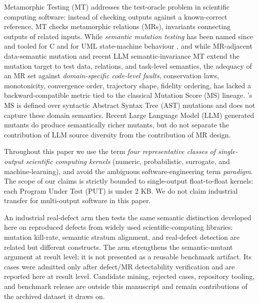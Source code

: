 \documentclass[manuscript,screen,review]{acmart}
\begin{document}
Metamorphic Testing (MT) addresses the test-oracle problem in scientific
computing software: instead of checking outputs against a known-correct
reference, MT checks metamorphic relations (MRs), invariants connecting
outputs of related inputs. While \emph{semantic mutation testing} has
been named since \citet{7a6c280d9584691800e71876c716ea229335abeb} and tooled for C \citep{dan2012smtc}
and for UML state-machine behaviour \citep{derezinska2019uml}, and while
MR-adjacent data-semantic mutation \citep{sun2016mumt,sun2024datamutation,zhu2020datamorphic,chan2024metamorphic}
and recent LLM semantic-invariance MT \citep{0fa97cc4e2a0ffb6a777669b1b541c0372fac0d2} extend the mutation target
to test data, relations, and task-level semantics, the adequacy of an MR
set against \emph{domain-specific code-level faults}, conservation laws,
monotonicity, convergence order, trajectory shape, fidelity ordering,
has lacked a backward-compatible metric tied to the classical Mutation
Score (MS) lineage. \citeauthor{d7c38286734419b52de4262c9802ebdfcf4b9447}'s \citeyearpar{d7c38286734419b52de4262c9802ebdfcf4b9447} MS is defined over syntactic
Abstract Syntax Tree (AST) mutations and does not capture these domain
semantics. Recent Large Language Model (LLM) generated mutants \citep{tip2025llmorpheus,humbatova2021deepcrime} do
produce semantically richer mutants, but do not separate the
contribution of LLM source diversity from the contribution of MR design.

Throughout this paper we use the term \emph{four representative classes
of single-output scientific computing kernels} (numeric, probabilistic,
surrogate, and machine-learning), and avoid the ambiguous
software-engineering term \emph{paradigm}. The scope of our claims is
strictly bounded to single-output float-to-float kernels: each
Program Under Test (PUT) is under 2 KB. We do not claim industrial transfer
for multi-output software in this paper.

An industrial real-defect arm then tests the same semantic
distinction developed here on reproduced defects from widely used
scientific-computing libraries: mutation kill-rate, semantic stratum
alignment, and real-defect detection are related but different
constructs. The arm strengthens the semantic-mutant argument at result
level; it is not presented as a reusable benchmark artifact. Its cases
were admitted only after defect/MR detectability verification and are
reported here at result level. Candidate mining, rejected cases,
repository tooling, and benchmark release are outside this manuscript
and remain contributions of the archived dataset it draws on.
\end{document}
